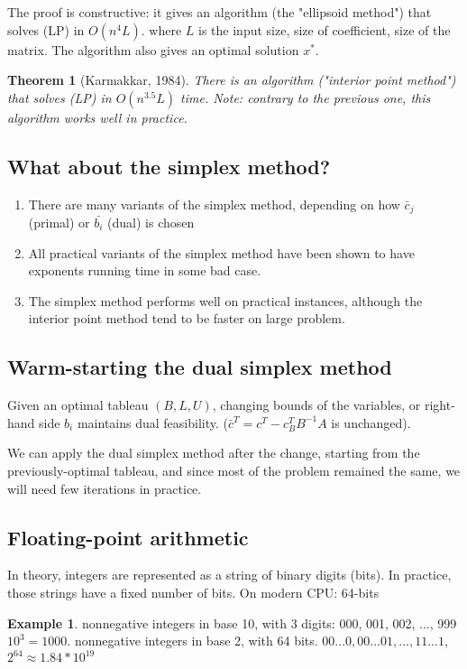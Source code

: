 \documentclass{article}
\theoremstyle{plain}
\newtheorem{thm}{Theorem}
\theoremstyle{definition}
\newtheorem{eg}{Example}
\begin{document}
The proof is constructive: it gives an algorithm (the "ellipsoid method")
that solves (LP) in $O(n^4L)$. where $L$ is the input size, size of coefficient,
size of the matrix.
The algorithm also gives an optimal solution
$x^*$.

\begin{thm}[Karmakkar, 1984]
    There is an algorithm ("interior point method") that solves (LP) in
    $O(n^{3.5}L)$ time. Note: contrary to the previous one, this algorithm works well
    in practice.
\end{thm}

\subsection{What about the simplex method?}
 \begin{enumerate}
    \item There are many variants of the simplex method, depending on
        how $\bar{c}_j$ (primal) or $\bar{b_i}$ (dual) is chosen
    \item All practical variants of the simplex method have been shown to have exponents
        running time in some bad case.
    \item The simplex method performs well on practical instances, although the interior
        point method tend to be faster on large problem.
\end{enumerate}

\subsection{Warm-starting the dual simplex method}
Given an optimal tableau $(B, L, U)$, changing bounds of the variables, or right-hand
side $b_i$ maintains dual feasibility.
($\bar{c}^T = c^T - c_B^TB^{-1}A$ is unchanged).

We can apply the dual simplex method after the change, starting from the
previously-optimal tableau, and since most of the problem remained the same, we
will need few iterations in practice.

\subsection{Floating-point arithmetic}
In theory, integers are represented as a string of binary digits (bits). In
practice, those strings have a fixed number of bits. On modern CPU: 64-bits

\begin{eg}
    nonnegative integers in base 10, with 3 digits: 000, 001, 002, ..., 999
    $10^3 = 1000$. nonnegative integers in base 2, with 64 bits.
    $00...0, 00...01, ..., 11...1$, $2^64 \approx 1.84*10^{19}$
\end{eg}
\end{document}
